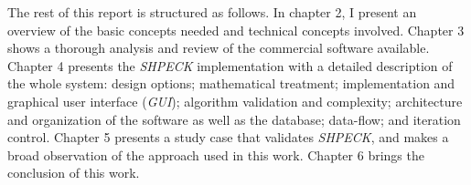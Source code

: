 The rest of this report is structured as follows. In chapter 2, I present an overview of the basic concepts needed and technical concepts involved. Chapter 3 shows a thorough analysis and review of the commercial software available. Chapter 4 presents the \emph{SHPECK} implementation with a detailed description of the whole system: design options; mathematical treatment; implementation and graphical user interface (\emph{GUI}); algorithm validation and complexity; architecture and organization of the software as well as the database; data-flow; and iteration control. Chapter 5 presents a study case that validates \emph{SHPECK}, and makes a broad observation of the approach used in this work. Chapter 6 brings the conclusion of this work. %
